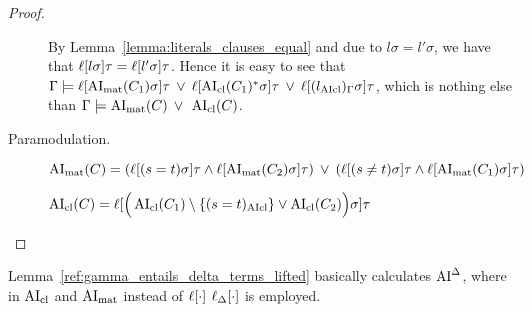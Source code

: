 \documentclass[,%
	paper=a4,%
	DIV12, %
	twoside=false,%
	liststotoc,
	bibtotoc,
	draft=false,%
	numbers=noendperiod
]{scrartcl}
\begin{document}
\begin{proof}
\begin{description}
			By Lemma~\ref{lemma:literals_clauses_equal} and due to $l\sigma = l'\sigma$, we have that $\ell[l\sigma]\tau = \ell[l'\sigma]\tau$.
			Hence it is easy to see that 
			$\Gamma \models \ell[\operatorname{AI}_\mathrm{mat}(C_1)\sigma]\tau \;\,{\lor}\;\, \ell[\operatorname{AI}_\mathrm{cl}(C_1)^*\sigma]\tau \;\,{\lor}\;\, \ell[(l_{\operatorname{AIcl}})_\Gamma\sigma]\tau $, which is nothing else than $\Gamma\entails\nolinebreak \AImatrix(C) \spam\lor \AIclause(C)$.

		\item[Paramodulation.]\hfill
			\begin{prooftree}
			\end{prooftree}

			$\operatorname{AI}_\mathrm{mat}(C) = (\ell[(s=t)\sigma]\tau \land \ell[\operatorname{AI}_\mathrm{mat}(C_2)\sigma]\tau ) \;\,{\lor}\;\, (\ell[(s\neq t)\sigma]\tau \land \ell[\operatorname{AI}_\mathrm{mat}(C_1)\sigma]\tau )$

			$\operatorname{AI}_\mathrm{cl}(C) = \ell[ \Big(\operatorname{AI}_\mathrm{cl}(C_1) \setminus \{(s=t)_{\operatorname{AIcl}}\} \lor \operatorname{AI}_\mathrm{cl}(C_2) \Big)\sigma]\tau $

			\mytodo{}

			\mytodo{}

			\mytodo{}

			\mytodo{}

			\mytodo{}

			\mytodo{}

			\mytodo{}

			\mytodo{}

			\mytodo{}




					\qedhere
	\end{description}
\end{proof}

\begin{conj}
	Lemma~\ref{ref:gamma_entails_delta_terms_lifted} basically calculates $\operatorname{AI}^\Delta$, where in $\operatorname{AI}_\mathrm{cl}$ and $\operatorname{AI}_\mathrm{mat}$ instead of $\ell[\cdot]$ $\ell_{\Delta}[\cdot]$ is employed.
\end{conj}
\end{document}
